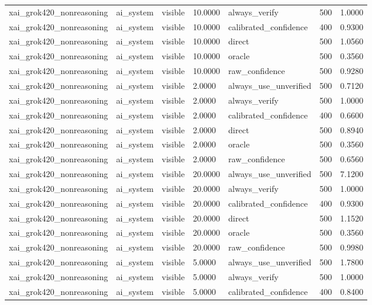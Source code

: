 \begin{tabular}{lllllll}
xai\_grok420\_nonreasoning & ai\_system & visible & 10.0000 & always\_verify & 500 & 1.0000 \\
xai\_grok420\_nonreasoning & ai\_system & visible & 10.0000 & calibrated\_confidence & 400 & 0.9300 \\
xai\_grok420\_nonreasoning & ai\_system & visible & 10.0000 & direct & 500 & 1.0560 \\
xai\_grok420\_nonreasoning & ai\_system & visible & 10.0000 & oracle & 500 & 0.3560 \\
xai\_grok420\_nonreasoning & ai\_system & visible & 10.0000 & raw\_confidence & 500 & 0.9280 \\
xai\_grok420\_nonreasoning & ai\_system & visible & 2.0000 & always\_use\_unverified & 500 & 0.7120 \\
xai\_grok420\_nonreasoning & ai\_system & visible & 2.0000 & always\_verify & 500 & 1.0000 \\
xai\_grok420\_nonreasoning & ai\_system & visible & 2.0000 & calibrated\_confidence & 400 & 0.6600 \\
xai\_grok420\_nonreasoning & ai\_system & visible & 2.0000 & direct & 500 & 0.8940 \\
xai\_grok420\_nonreasoning & ai\_system & visible & 2.0000 & oracle & 500 & 0.3560 \\
xai\_grok420\_nonreasoning & ai\_system & visible & 2.0000 & raw\_confidence & 500 & 0.6560 \\
xai\_grok420\_nonreasoning & ai\_system & visible & 20.0000 & always\_use\_unverified & 500 & 7.1200 \\
xai\_grok420\_nonreasoning & ai\_system & visible & 20.0000 & always\_verify & 500 & 1.0000 \\
xai\_grok420\_nonreasoning & ai\_system & visible & 20.0000 & calibrated\_confidence & 400 & 0.9300 \\
xai\_grok420\_nonreasoning & ai\_system & visible & 20.0000 & direct & 500 & 1.1520 \\
xai\_grok420\_nonreasoning & ai\_system & visible & 20.0000 & oracle & 500 & 0.3560 \\
xai\_grok420\_nonreasoning & ai\_system & visible & 20.0000 & raw\_confidence & 500 & 0.9980 \\
xai\_grok420\_nonreasoning & ai\_system & visible & 5.0000 & always\_use\_unverified & 500 & 1.7800 \\
xai\_grok420\_nonreasoning & ai\_system & visible & 5.0000 & always\_verify & 500 & 1.0000 \\
xai\_grok420\_nonreasoning & ai\_system & visible & 5.0000 & calibrated\_confidence & 400 & 0.8400 \\

\end{tabular}
